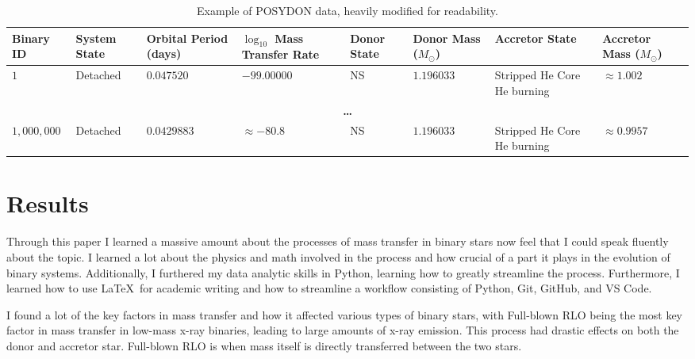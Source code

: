 \documentclass[12pt, a4paper]{article}
\begin{document}
    \begin{table}[H]
        \footnotesize
            \centering
            \begin{tabularx}{\textwidth}{||X|X|X|X|X|X|X|X||}
                \hline 
                \textbf{Binary ID} & 
                \textbf{System State} & 
                \textbf{Orbital Period (days)} & 
                \textbf{$\log_{10}$ Mass Transfer Rate} & 
                \textbf{Donor State} & 
                \textbf{Donor Mass} ($M_\odot$) & 
                \textbf{Accretor State} & 
                \textbf{Accretor Mass} ($M_\odot$) \\
                \hline \hline
                $1$ & Detached & $0.047520$ & $-99.00000$ & NS & $1.196033$ & Stripped He Core He burning & $\approx 1.002$ \\
                \hline
                \multicolumn{8}{||c||}{\textbf{\ldots}}\\
                \hline
                $1,000,000$ & Detached & $0.0429883$ & $\approx -80.8$ & NS & $1.196033$ & Stripped He Core He burning & $\approx 0.9957$ \\
                \hline
            \end{tabularx}
            \caption{Example of POSYDON data, heavily modified for readability.}
            \label{POSYDONDataExample}
        \end{table}
        


\section{Results}
    Through this paper I learned a massive amount about the processes of mass transfer in binary stars now feel that I could speak fluently about the topic. I learned a lot about the physics and math involved in the process and how crucial of a part it plays in the evolution of binary systems. Additionally, I furthered my data analytic skills in Python, learning how to greatly streamline the process. Furthermore, I learned how to use \LaTeX~for academic writing and how to streamline a workflow consisting of Python, Git, GitHub, and VS Code.

    I found a lot of the key factors in mass transfer and how it affected various types of binary stars, with Full-blown RLO being the most key factor in mass transfer in low-mass x-ray binaries, leading to large amounts of x-ray emission. This process had drastic effects on both the donor and accretor star. Full-blown RLO is when mass itself is directly transferred between the two stars.
\end{document}
